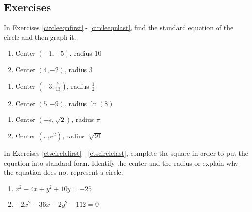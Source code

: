 \newpage

\subsection{Exercises}

In Exercises \ref{circleeqnfirst} - \ref{circleeqnlast}, find the standard equation of the circle and then graph it.

\begin{multicols}{2}
\begin{enumerate}

\item Center $(-1, -5)$, radius $10$  \label{circleeqnfirst}
\item Center $(4,-2)$, radius $3$

\setcounter{HW}{\value{enumi}}
\end{enumerate}
\end{multicols}

\begin{multicols}{2}
\begin{enumerate}
\setcounter{enumi}{\value{HW}}

\item Center $\left(-3, \frac{7}{13}\right)$, radius $\frac{1}{2}$

\item Center $(5, -9)$, radius $\ln(8)$


\setcounter{HW}{\value{enumi}}
\end{enumerate}
\end{multicols}

\begin{multicols}{2}
\begin{enumerate}
\setcounter{enumi}{\value{HW}}


\item Center $\left(-e, \sqrt{2}\right)$, radius $\pi$

\item Center $(\pi, e^{2})$, radius $\sqrt[3]{91}$ \label{circleeqnlast}

\setcounter{HW}{\value{enumi}}
\end{enumerate}
\end{multicols}


In Exercises \ref{ctscirclefirst} - \ref{ctscirclelast}, complete the square in order to put the equation into standard form.  Identify the center and the radius or explain why the equation does not represent a circle.


\begin{multicols}{2}
\begin{enumerate}
\setcounter{enumi}{\value{HW}}

\item $x^{2} - 4x + y^{2} + 10y = -25$  \label{ctscirclefirst}
\item $-2x^{2} - 36x - 2y^{2} - 112 = 0$

\setcounter{HW}{\value{enumi}}
\end{enumerate}
\end{multicols}

